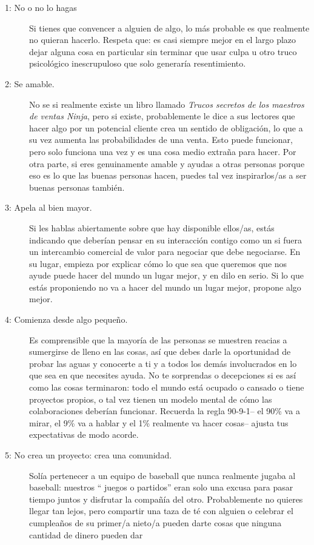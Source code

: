 \begin{description}

\item[1: No o no lo hagas]

Si tienes que convencer a alguien de algo,
lo más probable es que realmente no quieran hacerlo.
Respeta que:
es casi siempre mejor en el largo plazo dejar alguna cosa en particular sin terminar
que usar culpa u otro truco psicológico inescrupuloso que solo generaría resentimiento.


\item[2: Se amable.]
No se si realmente existe un libro llamado
 \emph{Trucos secretos de los maestros de ventas Ninja},
pero si existe,
probablemente le dice a sus lectores que hacer algo por un potencial cliente
crea un sentido de obligación,
lo que a su vez aumenta las probabilidades de una venta.
Esto puede funcionar, pero solo funciona una vez y es una cosa medio extraña para hacer.
Por otra parte,
si eres genuinamente amable
y ayudas a otras personas porque eso es lo que las buenas personas hacen,
puedes tal vez inspirarlos/as a ser buenas personas también.


\item[3: Apela al bien mayor.]
Si les hablas abiertamente sobre que hay disponible ellos/as,
estás indicando que deberían pensar en su interacción contigo
como un  si fuera un intercambio comercial de valor para negociar que debe negociarse.
En su lugar,
empieza por explicar cómo lo que sea que queremos que nos ayude puede hacer del mundo un lugar mejor, y en dilo en serio.
Si lo que estás proponiendo no va a hacer del mundo un lugar mejor,
propone algo mejor.

\item[4: Comienza desde algo pequeño.]
Es comprensible que la mayoría de las personas se muestren reacias a sumergirse de lleno en las cosas, 
así que debes darle  la oportunidad de probar las aguas 
y conocerte a ti y a todos los demás involucrados
 en lo que sea en  que necesites ayuda.
No te sorprendas o decepciones si es así como las cosas terminaron:
todo el mundo está ocupado o cansado o tiene proyectos propios,
o tal vez tienen un modelo mental de cómo las colaboraciones deberían funcionar.
Recuerda la regla  90-9-1-- el 90\% va a mirar,
el 9\% va a hablar 
y el 1\% realmente va hacer cosas-- ajusta tus expectativas de modo acorde.

\item[5: No crea un proyecto: crea una comunidad.]
Solía pertenecer a un equipo de baseball que nunca realmente jugaba al baseball:
nuestros “ juegos o partidos” eran solo una excusa para pasar tiempo juntos y disfrutar la compañía del otro.
Probablemente no quieres llegar tan lejos,
pero compartir una taza de té con alguien o celebrar el cumpleaños de su primer/a nieto/a
pueden darte cosas que ninguna cantidad de dinero pueden dar


\end{description}
